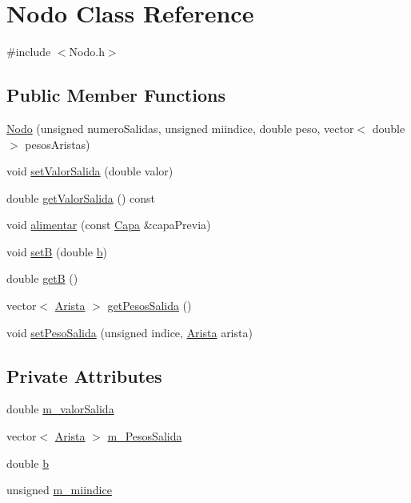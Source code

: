 \hypertarget{classNodo}{\section{Nodo Class Reference}
\label{classNodo}
}


{\ttfamily \#include $<$Nodo.\-h$>$}

\subsection*{Public Member Functions}
\begin{DoxyCompactItemize}
\item 
\hyperlink{classNodo_afb708898b880a4de342315a874c41da8}{Nodo} (unsigned numero\-Salidas, unsigned miindice, double peso, vector$<$ double $>$ pesos\-Aristas)
\item 
void \hyperlink{classNodo_a68e3ca116114771acd83bc92276f7978}{set\-Valor\-Salida} (double valor)
\item 
double \hyperlink{classNodo_aae7003873d5cdf18f87b530e9eb21c37}{get\-Valor\-Salida} () const 
\item 
void \hyperlink{classNodo_a9ee158f56659ac0ec5e079ba6e4423d4}{alimentar} (const \hyperlink{Capa_8h_af7763c80258043d4df4839c4942d819b}{Capa} \&capa\-Previa)
\item 
void \hyperlink{classNodo_a894f810838840e287266559b03d09766}{set\-B} (double \hyperlink{classNodo_a3ba0471f16ed34bb96408bebe24f3149}{b})
\item 
double \hyperlink{classNodo_afd4affc1fd3789b10e1c52f6c81ff506}{get\-B} ()
\item 
vector$<$ \hyperlink{structArista}{Arista} $>$ \hyperlink{classNodo_abdf076e5ad4b680f75d2a5fb73647adb}{get\-Pesos\-Salida} ()
\item 
void \hyperlink{classNodo_a504539adc007d73aa98ec3429fde76db}{set\-Peso\-Salida} (unsigned indice, \hyperlink{structArista}{Arista} arista)
\end{DoxyCompactItemize}
\subsection*{Private Attributes}
\begin{DoxyCompactItemize}
\item 
double \hyperlink{classNodo_a64be78936e6cb237eadcf540ac7ca93d}{m\-\_\-valor\-Salida}
\item 
vector$<$ \hyperlink{structArista}{Arista} $>$ \hyperlink{classNodo_af2f2e9e9ddebe2e969c76bbce0d3519f}{m\-\_\-\-Pesos\-Salida}
\item 
double \hyperlink{classNodo_a3ba0471f16ed34bb96408bebe24f3149}{b}
\item 
unsigned \hyperlink{classNodo_a433390fbd12030c7562f1601f3545a41}{m\-\_\-miindice}
\end{DoxyCompactItemize}


